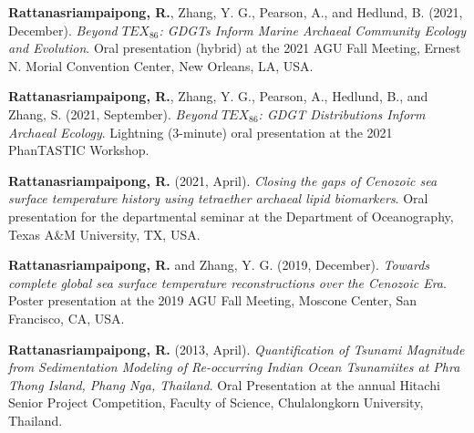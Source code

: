 \documentclass[10pt]{article}
\newcommand{\myname}[1]{\textbf{Rattanasriampaipong, R.}}
\begin{document}
\begin{etaremune}
\item {\myname{rattanasriampaipong}}, Zhang, Y. G., Pearson, A., and Hedlund, B. (2021, December). \textit{Beyond $TEX_{86}$: GDGTs Inform Marine Archaeal Community Ecology and Evolution}. Oral presentation (hybrid) at the 2021 AGU Fall Meeting, Ernest N. Morial Convention Center, New Orleans, LA, USA.

\item {\myname{rattanasriampaipong}}, Zhang, Y. G., Pearson, A., Hedlund, B., and Zhang, S. (2021, September). \textit{Beyond $TEX_{86}$: GDGT Distributions Inform Archaeal Ecology}. Lightning (3-minute) oral presentation at the 2021 PhanTASTIC Workshop.

\item {\myname{rattanasriampaipong}} (2021, April). \textit{Closing the gaps of Cenozoic sea surface temperature history using tetraether archaeal lipid biomarkers}. Oral presentation for the departmental seminar at the Department of Oceanography, Texas A\&M University, TX, USA.

\item {\myname{rattanasriampaipong}} and Zhang, Y. G. (2019, December). \textit{Towards complete global sea surface temperature reconstructions over the Cenozoic Era}. Poster presentation at the 2019 AGU Fall Meeting, Moscone Center, San Francisco, CA, USA.

\item {\myname{rattanasriampaipong}} (2013, April). \textit{Quantification of Tsunami Magnitude from Sedimentation Modeling of Re-occurring Indian Ocean Tsunamiites at Phra Thong Island, Phang Nga, Thailand}. Oral Presentation at the annual Hitachi Senior Project Competition, Faculty of Science, Chulalongkorn University, Thailand.
\end{etaremune}
\end{document}
